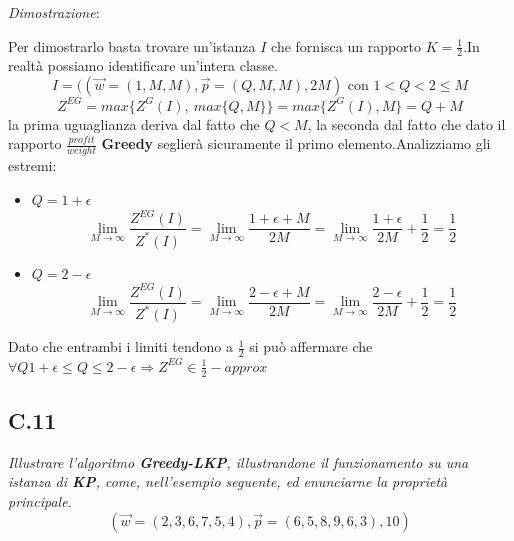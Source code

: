 \documentclass[a4paper]{article}
\newenvironment{dimostrazione}{\textit{Dimostrazione}:\begin{adjustwidth}{1cm}{}}{\end{adjustwidth}}
\begin{document}
\begin{dimostrazione}
	Per dimostrarlo basta trovare un'istanza $I$ che fornisca un rapporto $K=\frac{1}{2}$.In realtà possiamo identificare un'intera classe.
	$$I= ((\vec w = (1,M,M), \vec p = (Q,M,M),2M) \text{ con } 1<Q<2 \leq M$$
	$$ Z^{EG}= max\{Z^G(I),\: max\{Q,M\}\} = max\{Z^G(I),M\} = Q+M$$
	la prima uguaglianza deriva dal fatto che $Q < M$, la seconda dal fatto che dato il rapporto $\frac{profit}{weight}$ \textbf{Greedy} seglierà sicuramente il primo elemento.Analizziamo gli estremi:
	\begin{itemize}
		\item $Q= 1 + \epsilon$
			$$\lim_{M \to \infty} \frac{Z^{EG}(I)}{Z^*(I)} =  \lim_{M \to \infty}\frac{1+\epsilon + M}{2M} =\lim_{M \to \infty}\frac{1+\epsilon}{2M} + \frac{1}{2} = \frac{1}{2}$$
		\item $Q= 2 - \epsilon$
			$$\lim_{M \to \infty} \frac{Z^{EG}(I)}{Z^*(I)} =  \lim_{M \to \infty}\frac{2-\epsilon + M}{2M} =\lim_{M \to \infty}\frac{2-\epsilon}{2M} + \frac{1}{2} = \frac{1}{2}$$
	\end{itemize}
	Dato che entrambi i limiti tendono a $\frac{1}{2}$ si può affermare che $ \forall Q 1+\epsilon \leq Q \leq 2- \epsilon \Rightarrow Z^{EG} \in \frac{1}{2}-approx$
\end{dimostrazione}
\subsection{C.11}
\emph{Illustrare l’algoritmo \textbf{Greedy-LKP}, illustrandone il funzionamento su una istanza di \textbf{KP}, come, nell'esempio seguente, ed enunciarne la proprietà principale.}
$$(\vec w = (2, 3, 6, 7, 5, 4), \vec p = (6, 5, 8, 9, 6, 3), 10)$$
\end{document}
